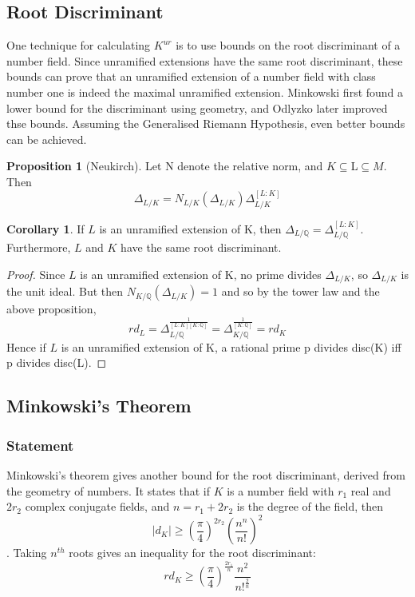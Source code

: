 \documentclass[12pt]{extarticle}
\newcommand{\<}{\langle}
\renewcommand{\>}{\rangle}
\theoremstyle{definition}
\newtheorem{corollary}{Corollary}
\newtheorem{proposition}{Proposition}
\begin{document}
\subsection{Root Discriminant}
One technique for calculating $K^{ur}$ is to use bounds on the root discriminant of a number field. Since unramified extensions have the same root discriminant, these bounds can prove that an unramified extension of a number field with class number one is indeed the maximal unramified extension. Minkowski first found a lower bound for the discriminant using geometry, and Odlyzko later improved thse bounds. Assuming the Generalised Riemann Hypothesis, even better bounds can be achieved. 
\begin{proposition}[Neukirch]
Let N denote the relative norm, and $K\subseteq $L$ \subseteq M $. Then \begin{equation}
    \Delta_{L/K} = N_{L/K}(\Delta_{L/K})\Delta_{L/K}^{[L:K]}
\end{equation}
\end{proposition}
\begin{corollary}
 If $L$ is an unramified extension of K, then $\Delta_{L/\mathbb{Q}}= \Delta_{L/\mathbb{Q}}^{[L:K]}$. Furthermore, $L$ and $K$ have the same root discriminant.
\end{corollary}
\begin{proof}
Since $L$ is an unramified extension of K, no prime divides $\Delta_{L/K}$, so $\Delta_{L/K}$ is the unit ideal. But then $N_{K/\mathbb{Q}}(\Delta_{L/K})=1$ and so by the tower law and the above proposition, \begin{equation}
    rd_L=\Delta_{L/\mathbb{Q}}^\frac{1}{[L:K][K:\mathbb{Q}]}=\Delta_{K/\mathbb{Q}}^\frac{1}{[K:\mathbb{Q}]}= rd_K
\end{equation}
Hence if $L$ is an unramified extension of K, a rational prime p divides disc(K) iff p divides disc(L).
\end{proof}
\subsection{Minkowski's Theorem}
\subsubsection*{Statement}
Minkowski's theorem gives another bound for the root discriminant, derived from the geometry of numbers. It states that if $K$ is a number field with $r_1$ real and $2r_2$ complex conjugate fields, and $n=r_1+2r_2$ is the degree of the field, then 
\begin{equation}
|d_K| \geqslant \left( \frac{\pi}{4}\right)^{2r_2} \left( \frac{n^n}{n!}\right)^2
\end{equation}. Taking $n^{th}$ roots gives an inequality for the root discriminant:
\begin{equation}
rd_K\geqslant (\frac{\pi}{4})^{\frac{2r_1}{n}}\frac{n^2}{n!^{\frac{2}{n}}}
\end{equation} 
\end{document}
